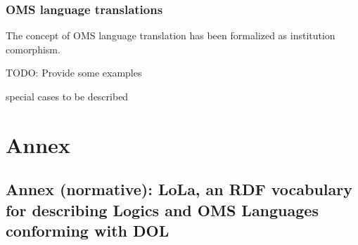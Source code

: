 \documentclass[10pt,fleqn,%
\ifpretendfinal
final%
\else
draft%
\fi,
]{scrreprt}
\makeatletter
\newcommand*\CommentAuthor{}
\renewcommand*\CommentAuthor{#1}}
\newcommand*\CommentDate{}
\renewcommand*\CommentDate{#1}}
\newcommand*\CommentId{}
\renewcommand*\CommentId{#1}}
\newcommand*\CommentType{}
\renewcommand*\CommentType{#1}}
\newcommand*{\SetCommentColorByType}[1]{%
\edef\localType{{#1}}%
\expandafter\ifstrequal\localType{q-aut}{\colorlet{CommentColor}{red}}{%
\expandafter\ifstrequal\localType{q-all}{\colorlet{CommentColor}{orange}}{%
\expandafter\ifstrequal\localType{todo}{\colorlet{CommentColor}{orange}}{%
\expandafter\ifstrequal\localType{fyi}{\colorlet{CommentColor}{lightgray}}{%
\colorlet{CommentColor}{yellow}}}}}}
\newcommand*{\SetCommentPrefixByType}[1]{%
\edef\localType{{#1}}%
\expandafter\@ifmtarg\localType{%
\edef\CommentPrefix{}%
}{%
\caseupper[q]{#1}%
\edef\CommentPrefix{\thestring: }%
}}
\newcommand*{\initComment}[1]{%
\setkeys{Comment}{#1}%
\SetCommentColorByType{\CommentType}%
\relax%
\SetCommentPrefixByType{\CommentType}%
\relax%
}
\newcommand*{\todonote}[2][]{%
\initComment{#1}%
\pdfcomment[author=\CommentAuthor,color=CommentColor,date=\CommentDate,id=\CommentId]{%
\CommentPrefix
#2}}
\renewcommand*{\todonote}[2][]{%
\initComment{#1}%
\ednote{\CommentPrefix #2}}
\newcommand*{\CL}{\ensuremath{\mathsf{CL}}\xspace}
\newcommand{\sclause}[1]{\section{#1}}
\makeatother
\begin{document}
%
%



\sclause{OMS language translations}
The concept of OMS language translation has been
formalized as institution comorphism.

TODO: Provide some examples

special cases to be described


\part*{Annex}

\appendix

\chapter[LoLa RDF vocabulary]{Annex (normative): LoLa, an RDF vocabulary for describing Logics and OMS Languages conforming with DOL}\label{a:lola}
\end{document}
